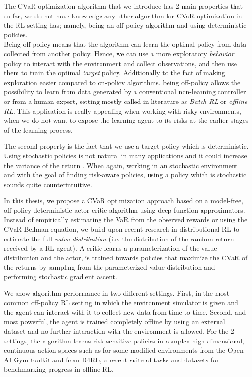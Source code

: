 The CVaR optimization algorithm that we introduce has 2 main properties that so far,
we do not have knowledge any other algorithm for CVaR optimization in the RL setting has; 
namely, being an off-policy algorithm and using deterministic policies.\\
Being off-policy means that the algorithm can learn the optimal policy from data collected
from another policy. Hence, we can use a more exploratory \textit{behavior} policy to interact
with the environment and collect observations, and then use them to train
the optimal \textit{target} policy. 
Additionally to the fact of making exploration easier compared to on-policy algorithms,
being off-policy allows the possibility to learn from data generated by a conventional
non-learning controller or from a human expert, setting mostly called in literature as
\textit{Batch RL} or \textit{offline RL}.
This application is really appealing when working with risky environments, when we do
not want to expose the learning agent to its risks at the earlier stages of the learning
process.


The second property is the fact that we use a target policy which is deterministic.
Using stochastic policies is not natural in many applications and it
could increase the variance of the return .
When again, working in an stochastic 
environment and with the goal of finding risk-aware policies, using a policy which is stochastic 
sounds quite counterintuitive.

In this thesis, we propose a CVaR optimization approach based on a model-free, off-policy
deterministic actor-critic algorithm using deep function approximators. 
Instead of empirically estimating the VaR from the observed rewards or using the CVaR
Bellman equation, we build upon recent research in distributional RL 
\citep{Bellemare2017,Dabney2018a,Dabney2018b}
to estimate the full
\textit{value distribution} (i.e. the distribution of the random return received by a RL agent).
A critic learns a parameterization of the value distribution and 
the actor, is trained towards policies that maximize the CVaR of the returns 
by sampling from the parameterized value distribution and performing stochastic gradient ascent.

We show algorithm performance in two different settings.
First, in the most common off-policy RL setting in which the environment simulator is given and
the agent can interact with it to collect new data from time to time.
Second, and most powerful, the agent is trained completely offline by using an external
dataset and no further interaction with the environment is allowed.
For the 2 settings, the algorithm learns risk-sensitive policies in
complex high-dimensional, continuous action spaces
such as for some modified environments from the Open AI Gym toolkit and from D4RL,
a recent suite of tasks and datasets for benchmarking progress in offline RL.







